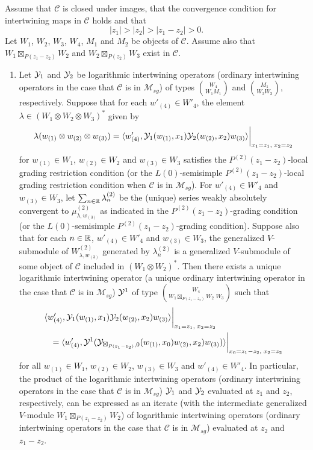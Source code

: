 \documentclass[12pt]{article}
\begin{document}
\begin{corol}
Assume that $\mathcal{C}$ is closed under images, that the convergence
condition for intertwining maps in $\mathcal{C}$ holds and that
\[
|z_1|>|z_2|>|z_{1}-z_{2}|>0.
\]
Let $W_{1}$, $W_{2}$, $W_{3}$, $W_{4}$, $M_{1}$ and $M_{2}$ be objects
of $\mathcal{C}$.  Assume also that $W_1\boxtimes_{P(z_{1}-z_{2})} W_2$ and
$W_2\boxtimes_{P(z_2)} W_3$ exist in $\mathcal{C}$.

\begin{enumerate}

\item Let $\mathcal{Y}_{1}$ and $\mathcal{Y}_{2}$ be logarithmic intertwining operators
(ordinary intertwining operators in the 
case that $\mathcal{C}$ is in $\mathcal{M}_{sg}$) 
of types ${W_4}\choose {W_1M_1}$ and ${M_1}\choose {W_2W_3}$,
respectively.  Suppose that for each $w'_{(4)} \in W'_{4}$, the
element $\lambda\in (W_{1}\otimes W_{2}\otimes W_{3})^{*}$ given by
\[
\lambda(w_{(1)}\otimes w_{(2)}\otimes w_{(3)})
=\langle w'_{(4)}, \mathcal{Y}_1(w_{(1)}, x_{1})\mathcal{Y}_2(w_{(2)}, x_{2})w_{(3)}\rangle
\bigg\vert_{x_{1}=z_{1},\;x_{2}=z_{2}}
\]
for $w_{(1)}\in W_{1}$, $w_{(2)}\in
W_{2}$ and $w_{(3)}\in W_{3}$ satisfies the $P^{(2)}(z_{1}-z_{2})$-local
grading restriction condition (or the $L(0)$-semisimple
$P^{(2)}(z_{1}-z_{2})$-local grading restriction condition when $\mathcal{C}$
is in $\mathcal{M}_{sg}$). For $w'_{(4)}\in W'_{4}$ and $w_{(3)}\in
W_{3}$, let $\sum_{n\in \mathbb{R}}\lambda_{n}^{(2)}$ be the (unique) series
weakly absolutely convergent to $\mu^{(2)}_{\lambda, w_{(3)}}$ as
indicated in the $P^{(2)}(z_{1}-z_{2})$-grading condition (or the
$L(0)$-semisimple $P^{(2)}(z_{1}-z_{2})$-grading condition).  Suppose also
that for each $n \in \mathbb{R}$, $w'_{(4)} \in W'_4$ and $w_{(3)} \in W_3$,
the generalized $V$-submodule of $W^{(2)}_{\lambda, w_{(3)}}$
generated by $\lambda_{n}^{(2)}$ is a generalized $V$-submodule of
some object of $\mathcal{C}$ included in $(W_1 \otimes W_2)^*$.  Then
there exists a unique logarithmic intertwining operator (a unique
ordinary intertwining operator in the case that $\mathcal{C}$ is in
$\mathcal{M}_{sg}$) $\mathcal{Y}^{1}$ of type ${W_4\choose
W_1\boxtimes_{P(z_{1}-z_{2})} W_2\,\,W_3}$ such that
\begin{eqnarray*}
\lefteqn{\langle w'_{(4)},\Y_1(w_{(1)}, x_{1}) \Y_2(w_{(2)}, x_{2}) w_{(3)}\rangle
\lbar_{x_{1}=z_{1},\;x_{2}=z_{2}}}\nn
&&=\langle w'_{(4)}, \Y^{1}(\Y_{\boxtimes_{P(z_{1}-z_{2})}, 0}
(w_{(1)}, x_{0})w_{(2)}, x_{2})w_{(3)})\rangle
\lbar_{x_{0}=z_{1}-z_{2},\;x_{2}=z_{2}}
\end{eqnarray*}
for all $w_{(1)}\in
W_1$, $w_{(2)}\in W_2$, $w_{(3)}\in W_3$ and $w'_{(4)}\in W'_4$.  In
particular, the product of the logarithmic intertwining operators
(ordinary intertwining operators in the case that $\mathcal{C}$ is in
$\mathcal{M}_{sg}$) $\mathcal{Y}_{1}$ and $\mathcal{Y}_{2}$ evaluated at $z_{1}$ and
$z_{2}$, respectively, can be expressed as an iterate (with the
intermediate generalized $V$-module $W_1\boxtimes_{P(z_{1}-z_{2})} W_2$) of
logarithmic intertwining operators (ordinary intertwining operators in
the case that $\mathcal{C}$ is in $\mathcal{M}_{sg}$) evaluated at
$z_{2}$ and $z_{1}-z_{2}$.


\end{enumerate}
\end{corol}
\end{document}
